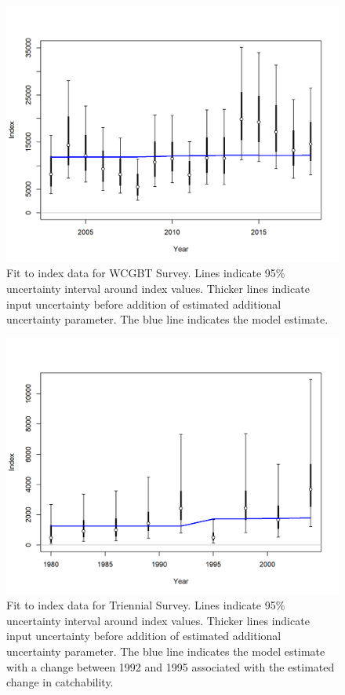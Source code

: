 \documentclass[12pt,]{article}
\begin{document}
\FloatBarrier

\vspace{.5cm}

\begin{figure}
\centering
\includegraphics{r4ss/plots_mod1/index2_cpuefit_WCGBT Survey.png}
\caption{Fit to index data for WCGBT Survey. Lines indicate 95\%
uncertainty interval around index values. Thicker lines indicate input
uncertainty before addition of estimated additional uncertainty
parameter. The blue line indicates the model
estimate.\label{fig:index2_cpuefit_WCGBTS}}
\end{figure}

\begin{figure}
\centering
\includegraphics{r4ss/plots_mod1/index2_cpuefit_Triennial Survey.png}
\caption{Fit to index data for Triennial Survey. Lines indicate 95\%
uncertainty interval around index values. Thicker lines indicate input
uncertainty before addition of estimated additional uncertainty
parameter. The blue line indicates the model estimate with a change
between 1992 and 1995 associated with the estimated change in
catchability.\label{fig:index2_cpuefit_Triennial}}
\end{figure}
\end{document}
